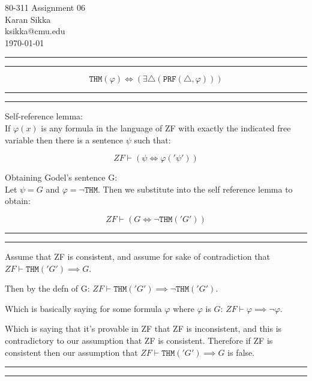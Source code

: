 \documentclass[11pt,letterpaper]{article}
\makeatletter
\newcommand{\question}[1] {\vspace{.25in} \hrule\vspace{0.5em}
\noindent{\bf #1} \vspace{0.5em}
\hrule \vspace{.10in}}
\newcommand{\myname}{Karan Sikka}
\newcommand{\myandrew}{ksikka@cmu.edu}
\newcommand{\myhwnum}{06}
\makeatother
\begin{document}
\medskip

\thispagestyle{plain}
\begin{center}                  %
{\Large 80-311 Assignment \myhwnum} \\
\myname \\
\myandrew \\
\today
\end{center}

\question{1.1}
$$ \mathtt{THM}(\varphi) \iff (\exists \triangle (\mathtt{PRF}(\triangle, \varphi))) $$

\question{1.2}
Self-reference lemma: \\
If $\varphi(x)$ is any formula in the language of ZF
with exactly the indicated free variable then there is a sentence $\psi$
such that:

$$ ZF \vdash (\psi \iff \varphi('\psi')) $$

Obtaining Godel's sentence G: \\
Let $\psi = G$ and $\varphi = \neg \mathtt{THM}$. Then we substitute into the self reference lemma to obtain:

$$ ZF \vdash (G \iff \neg \mathtt{THM}('G')) $$

\question{1.3}
Assume that ZF is consistent, and assume for sake of contradiction that $ZF \vdash \mathtt{THM}('G') \implies G$.

Then by the defn of G:
$ZF \vdash \mathtt{THM}('G') \implies \neg \mathtt{THM}('G')$.

Which is basically saying for some formula $\varphi$ where $\varphi$ is $G$:
$ZF \vdash \varphi \implies \neg \varphi$.

Which is saying that it's provable in ZF that ZF is inconsistent, and this is contradictory to our assumption that ZF is consistent. Therefore
if ZF is consistent then our assumption that $ZF \vdash \mathtt{THM}('G') \implies G$ is false.

\question{2.1}
\end{document}
